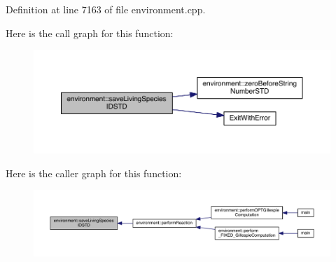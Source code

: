 Definition at line 7163 of file environment.\-cpp.



Here is the call graph for this function\-:
\nopagebreak
\begin{figure}[H]
\begin{center}
\leavevmode
\includegraphics[width=350pt]{a00014_a623c3cda23a18cb7b039c5a666408d72_cgraph}
\end{center}
\end{figure}




Here is the caller graph for this function\-:
\nopagebreak
\begin{figure}[H]
\begin{center}
\leavevmode
\includegraphics[width=350pt]{a00014_a623c3cda23a18cb7b039c5a666408d72_icgraph}
\end{center}
\end{figure}


